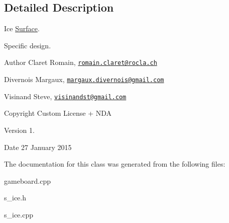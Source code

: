 \subsection{Detailed Description}
Ice \hyperlink{class_surface}{Surface}. 

Specific design. \begin{DoxyAuthor}{Author}
Claret Romain, \href{mailto:romain.claret@rocla.ch}{\tt romain.\+claret@rocla.\+ch} 

Divernois Margaux, \href{mailto:margaux.divernois@gmail.com}{\tt margaux.\+divernois@gmail.\+com} 

Visinand Steve, \href{mailto:visinandst@gmail.com}{\tt visinandst@gmail.\+com} 
\end{DoxyAuthor}
\begin{DoxyCopyright}{Copyright}
Custom License + N\+D\+A 
\end{DoxyCopyright}
\begin{DoxyVersion}{Version}
1. 
\end{DoxyVersion}
\begin{DoxyDate}{Date}
27 January 2015 
\end{DoxyDate}


The documentation for this class was generated from the following files\+:\begin{DoxyCompactItemize}
\item 
gameboard.\+cpp\item 
s\+\_\+ice.\+h\item 
s\+\_\+ice.\+cpp\end{DoxyCompactItemize}
